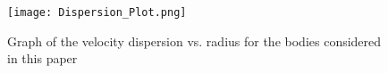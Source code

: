 \documentclass[iop]{emulateapj}
\begin{document}
\begin{figure}
    \centering
    \texttt{[image: Dispersion\_Plot.png]}
    \caption{Graph of the velocity dispersion vs. radius for the bodies considered in this paper}
\end{figure}









\end{document}
